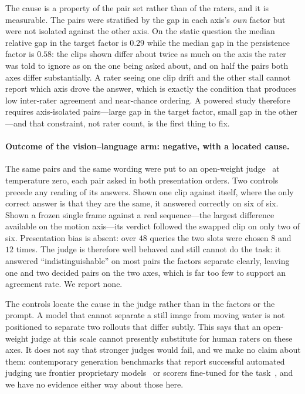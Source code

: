 \documentclass[10pt,twocolumn,letterpaper]{article}
\begin{document}
The cause is a property of the pair set rather than of the raters, and it is
measurable. The pairs were stratified by the gap in each axis's \emph{own}
factor but were not isolated against the other axis. On the static question the
median relative gap in the target factor is $0.29$ while the median gap in the
persistence factor is $0.58$: the clips shown differ about twice as much on the
axis the rater was told to ignore as on the one being asked about, and on half
the pairs both axes differ substantially. A rater seeing one clip drift and the
other stall cannot report which axis drove the answer, which is exactly the
condition that produces low inter-rater agreement and near-chance ordering. A
powered study therefore requires axis-isolated pairs---large gap in the target
factor, small gap in the other---and that constraint, not rater count, is the
first thing to fix.

\paragraph{Outcome of the vision--language arm: negative, with a located cause.}
The same pairs and the same wording were put to an open-weight
judge~\cite{qwen3vl2025} at temperature zero, each pair asked in both
presentation orders. Two controls precede any reading of its answers. Shown one
clip against itself, where the only correct answer is that they are the same, it
answered correctly on six of six. Shown a frozen single frame against a real
sequence---the largest difference available on the motion axis---its verdict
followed the swapped clip on only two of six. Presentation bias is absent: over
$48$ queries the two slots were chosen $8$ and $12$ times. The judge is
therefore well behaved and still cannot do the task: it answered
``indistinguishable'' on most pairs the factors separate clearly, leaving one
and two decided pairs on the two axes, which is far too few to support an
agreement rate. We report none.

The controls locate the cause in the judge rather than in the factors or the
prompt. A model that cannot separate a still image from moving water is not
positioned to separate two rollouts that differ subtly. This says that an
open-weight judge at this scale cannot presently substitute for human raters on
these axes. It does not say that stronger judges would fail, and we make no
claim about them: contemporary generation benchmarks that report successful
automated judging use frontier proprietary
models~\cite{han2025videobench,sun2024t2v_compbench} or scorers fine-tuned for
the task~\cite{he2024videoscore}, and we have no evidence either way about those
here.
\end{document}
